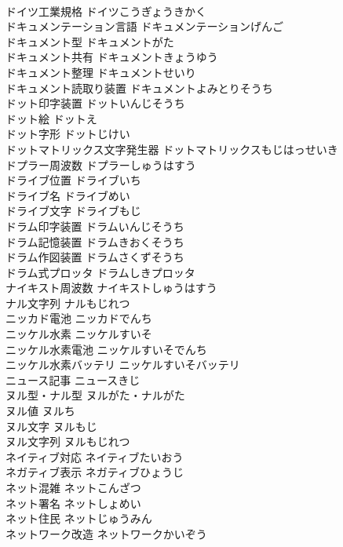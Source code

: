 \documentclass[8pt]{extreport}
\begin{document}
\begin{CJK}{UTF8}{min}
\\	ドイツ工業規格	ドイツこうぎょうきかく	
\\	ドキュメンテーション言語	ドキュメンテーションげんご	
\\	ドキュメント型	ドキュメントがた	
\\	ドキュメント共有	ドキュメントきょうゆう	
\\	ドキュメント整理	ドキュメントせいり	
\\	ドキュメント読取り装置	ドキュメントよみとりそうち	
\\	ドット印字装置	ドットいんじそうち	
\\	ドット絵	ドットえ	
\\	ドット字形	ドットじけい	
\\	ドットマトリックス文字発生器	ドットマトリックスもじはっせいき	
\\	ドプラー周波数	ドプラーしゅうはすう	
\\	ドライブ位置	ドライブいち	
\\	ドライブ名	ドライブめい	
\\	ドライブ文字	ドライブもじ	
\\	ドラム印字装置	ドラムいんじそうち	
\\	ドラム記憶装置	ドラムきおくそうち	
\\	ドラム作図装置	ドラムさくずそうち	
\\	ドラム式プロッタ	ドラムしきプロッタ	
\\	ナイキスト周波数	ナイキストしゅうはすう	
\\	ナル文字列	ナルもじれつ	
\\	ニッカド電池	ニッカドでんち	
\\	ニッケル水素	ニッケルすいそ	
\\	ニッケル水素電池	ニッケルすいそでんち	
\\	ニッケル水素バッテリ	ニッケルすいそバッテリ	
\\	ニュース記事	ニュースきじ	
\\	ヌル型・ナル型	ヌルがた・ナルがた	
\\	ヌル値	ヌルち	
\\	ヌル文字	ヌルもじ	
\\	ヌル文字列	ヌルもじれつ	
\\	ネイティブ対応	ネイティブたいおう	
\\	ネガティブ表示	ネガティブひょうじ	
\\	ネット混雑	ネットこんざつ	
\\	ネット署名	ネットしょめい	
\\	ネット住民	ネットじゅうみん	
\\	ネットワーク改造	ネットワークかいぞう	

\end{CJK}
\end{document}
